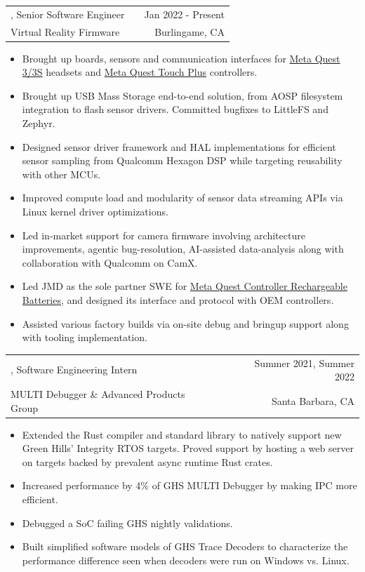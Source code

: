 \documentclass[letterpaper,10pt]{article}
\makeatletter
\let\stdtextbf\textbf
\renewcommand{\textbf}[1]{{\fontfamily{bch}\selectfont\stdtextbf{#1}}}
\newlength{\blockgap}\setlength{\blockgap}{6pt}
\newlength{\itemgap}\setlength{\itemgap}{3pt}
\newenvironment{jobitem}[5]{%
    \begin{tabularx}{\linewidth}{@{}l X r@{}}
        \textbf{#1}, #2 & & #3 \\[\itemgap]
        #4              & & #5
    \end{tabularx}
    \vspace{-5pt}
    \begin{itemize}
}{%
    \end{itemize}
    \vspace{\blockgap}
}
\makeatother
\begin{document}
\begin{jobitem}{Meta}{Senior Software Engineer}{Jan 2022 - Present}{Virtual Reality Firmware}{Burlingame, CA}
    \item Brought up boards, sensors and communication interfaces for \href{https://www.meta.com/quest/quest-3/}{Meta Quest 3/3S} headsets and \href{https://www.meta.com/quest/accessories/quest-touch-plus-controller/}{Meta Quest Touch Plus} controllers.
    \item Brought up USB Mass Storage end-to-end solution, from AOSP filesystem integration to flash sensor drivers. Committed bugfixes to LittleFS and Zephyr.
    \item Designed sensor driver framework and HAL implementations for efficient sensor sampling from Qualcomm Hexagon DSP while targeting reusability with other MCUs.
    \item Improved compute load and modularity of sensor data streaming APIs via Linux kernel driver optimizations.
    \item Led in-market support for camera firmware involving architecture improvements, agentic bug-resolution, AI-assisted data-analysis along with collaboration with Qualcomm on CamX.
    \item Led JMD as the sole partner SWE for \href{https://www.meta.com/quest/accessories/quest-rechargeable-controller-batteries/}{Meta Quest Controller Rechargeable Batteries}, and designed its interface and protocol with OEM controllers.
    \item Assisted various factory builds via on-site debug and bringup support along with tooling implementation.
\end{jobitem}

\begin{jobitem}{Green Hills Software}{Software Engineering Intern}{Summer 2021, Summer 2022}{MULTI Debugger \& Advanced Products Group}{Santa Barbara, CA}
    \item Extended the Rust compiler and standard library to natively support new Green Hills' Integrity RTOS targets. Proved support by hosting a web server on targets backed by prevalent async runtime Rust crates.
    \item Increased performance by 4\% of GHS MULTI Debugger by making IPC more efficient.
    \item Debugged a SoC failing GHS nightly validations.
    \item Built simplified software models of GHS Trace Decoders to characterize the performance difference seen when decoders were run on Windows vs. Linux.
\end{jobitem}
\end{document}
